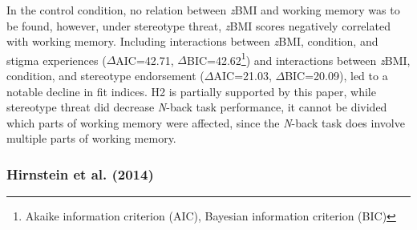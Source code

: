 \documentclass[
  stu,floatsintext]{apa7}
\begin{document}
In the control condition, no relation between \emph{z}BMI and working memory was to be found, however, under stereotype threat, \emph{z}BMI scores negatively correlated with working memory.
Including interactions between \emph{z}BMI, condition, and stigma experiences (\(\Delta\)AIC=42.71, \(\Delta\)BIC=42.62\footnote{Akaike information criterion (AIC), Bayesian information criterion (BIC)}) and interactions between \emph{z}BMI, condition, and stereotype endorsement (\(\Delta\)AIC=21.03, \(\Delta\)BIC=20.09), led to a notable decline in fit indices.
H2 is partially supported by this paper, while stereotype threat did decrease \emph{N}-back task performance, it cannot be divided which parts of working memory were affected, since the \emph{N}-back task does involve multiple parts of working memory.

\subsubsection{Hirnstein et al. (2014)}\label{hirnsteingenderstereotypingcognitivesex2014}
\end{document}
